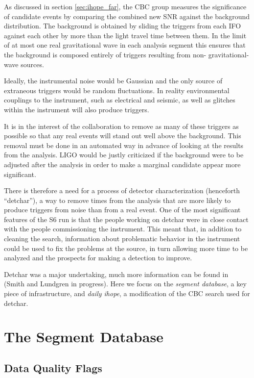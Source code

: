 As discussed in section \ref{sec:ihope_far}, the CBC group measures the
significance of candidate events by comparing the combined new SNR
against the background distribution.  The background is obtained by
sliding the triggers from each IFO against each other by more than the
light travel time between them.  In the limit of at most one real
gravitational wave in each analysis segment this ensures that the
background is composed entirely of triggers resulting from non-
gravitational-wave sources.

Ideally, the instrumental noise would be Gaussian and the only source
of extraneous triggers would be random fluctuations.  In reality
environmental couplings to the instrument, such as electrical and
seismic, as well as glitches within the instrument will also produce
triggers.

It is in the interest of the collaboration to remove as many of these
triggers as possible so that any real events will stand out 
well above the background.  This removal must be done in
an automated way in advance of looking at the results from the
analysis.  LIGO would be justly criticized if the background were
to be adjusted after the analysis in order to make a marginal candidate
appear more significant.

There is therefore a need for a process of detector characterization
(henceforth ``detchar''), a way to remove times from the analysis that
are more likely to produce triggers from noise than from a real event.
One of the most significant features of the S6 run is that the people
working on detchar were in close contact with the people commissioning
the instrument.  This meant that, in addition to cleaning the search,
information about problematic behavior in the instrument could be used
to fix the problems at the source, in turn allowing more time to be
analyzed and the prospects for making a detection to improve.

Detchar was a major undertaking, much more information can be found in
(Smith and Lundgren in progress).  Here we focus on the \emph{segment
database}, a key piece of infrastructure, and \emph{daily ihope}, a
modification of the CBC search used for detchar.


\section{The Segment Database}

\subsection{Data Quality Flags}

